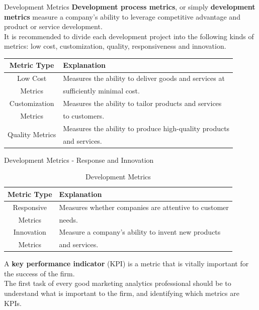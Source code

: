 \documentclass[pdf]{beamer}
\newcommand{\empr}[1]{{\color{franklinblue}\textbf{#1}}}
\theoremstyle{remark}
\theoremstyle{definition}
\begin{document}
\begin{frame}[t]{Development Metrics}
\empr{Development process metrics}, or simply \empr{development metrics} measure a company's ability to leverage competitive advantage and product or service development. \\
\vspace{1.5ex}
It is recommended to divide each development project into the following kinds of metrics: low cost, customization, quality, responsiveness and innovation. \\
\vspace{1.5ex}
\footnotesize
\begin{table}[htbp]
  \centering
  \captionsetup{justification=centering}
    \begin{tabular}{|c|l|}
    \toprule
    Metric Type & Explanation \\
    \midrule
   Low Cost  &  Measures the ability to deliver goods and services at \\
   Metrics & sufficiently minimal cost.\\
   \midrule 
   Customization & Measures the ability to tailor products and services \\
   Metrics & to customers. \\
    \midrule
   \multirow{2}{*}{Quality Metrics} & Measures the ability to produce high-quality products \\
   & and services. \\
  \bottomrule
     \end{tabular}%
  \label{tab:custmetrics}%
\end{table}%
\end{frame}

\begin{frame}[t]{Development Metrics - Response and Innovation}
\footnotesize
\begin{table}[htbp]
  \centering
  \captionsetup{justification=centering}
    \begin{tabular}{|c|l|}
    \toprule
     Metric Type & Explanation \\
    \midrule
   Responsive & Measures whether companies are attentive to customer \\ 
   Metrics & needs. \\ 
      \midrule 
   Innovation & Measure a company's ability to invent new products \\
   Metrics & and services.  \\ 
    \bottomrule
     \end{tabular}%
  \caption{Development Metrics}
  \label{tab:custmetrics}%
\end{table}%
\vspace{-2.0ex}
\normalsize
A \empr{key performance indicator} (KPI) is a metric that is vitally important for the success of the firm. \\
\vspace{1.5ex}
The first task of every good marketing analytics professional should be to understand what is important to the firm, and identifying which metrics are KPIs.
\end{frame}
\end{document}
